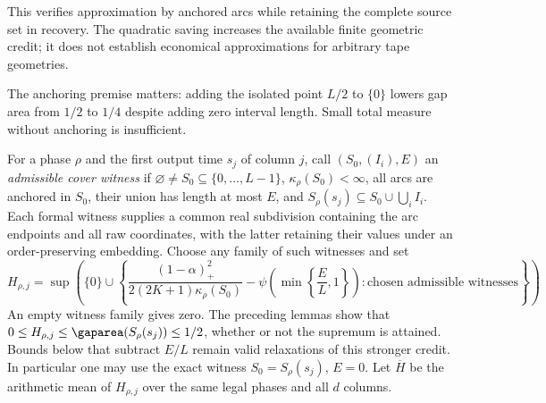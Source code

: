 This verifies approximation by anchored arcs while retaining the complete
source set in recovery. The quadratic saving increases the available
finite geometric credit; it does not establish economical approximations
for arbitrary tape geometries.

The anchoring premise matters: adding the isolated point $L/2$ to
$\{0\}$ lowers gap area from $1/2$ to $1/4$ despite adding zero
interval length. Small total measure without anchoring is insufficient.

For a phase $\rho$ and the first output time $s_j$ of column $j$, call
$(S_0,(I_i),E)$ an \emph{admissible cover witness} if
$\varnothing\ne S_0\subseteq\{0,\ldots,L-1\}$,
$\kappa_\rho(S_0)<\infty$, all arcs are anchored in $S_0$, their union
has length at most $E$, and
$S_\rho(s_j)\subseteq S_0\cup\bigcup_i I_i$.
Each formal witness supplies a common real subdivision containing the
arc endpoints and all raw coordinates, with the latter retaining their
values under an order-preserving embedding.
Choose any family of such witnesses and set
\begin{equation}\label{eq:cover-credit}
 H_{\rho,j}=\sup\left(\{0\}\cup
 \left\{\frac{(1-\alpha)_+^2}{2(2K+1)\kappa_\rho(S_0)}
           -\psi\!\left(\min\!\left\{\frac EL,1\right\}\right):
              \text{chosen admissible witnesses}\right\}\right).
\end{equation}
An empty witness family gives zero. The preceding lemmas show that
$0\le H_{\rho,j}\le\gaparea(S_\rho(s_j))\le1/2$, whether or not the
supremum is attained. Bounds below that subtract $E/L$ remain valid
relaxations of this stronger credit. In particular one may use the exact witness
$S_0=S_\rho(s_j)$, $E=0$. Let $\overline H$ be the arithmetic mean
of $H_{\rho,j}$ over the same legal phases and all $d$ columns.

